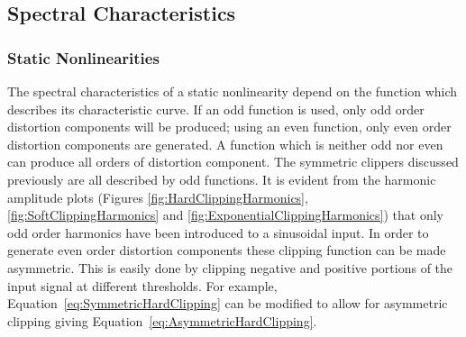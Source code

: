 %			
%
%			

	\subsection{Spectral Characteristics}
	\label{sec:ExcitationEvaluation-Comparison-SpectralCharacteristics}
		\subsubsection*{Static Nonlinearities}
			The spectral characteristics of a static nonlinearity depend on the function which describes its
			characteristic curve. If an odd function is used, only odd order distortion components will be
			produced; using an even function, only even order distortion components are generated. A function
			which is neither odd nor even can produce all orders of distortion component. The symmetric
			clippers discussed previously are all described by odd functions. It is evident from the harmonic
			amplitude plots (Figures \ref{fig:HardClippingHarmonics}, \ref{fig:SoftClippingHarmonics} and
			\ref{fig:ExponentialClippingHarmonics}) that only odd order harmonics have been introduced to a
			sinusoidal input. In order to generate even order distortion components these clipping function can
			be made asymmetric. This is easily done by clipping negative and positive portions of the input
			signal at different thresholds. For example, Equation~\ref{eq:SymmetricHardClipping} can be
			modified to allow for asymmetric clipping giving Equation~\ref{eq:AsymmetricHardClipping}.
			
